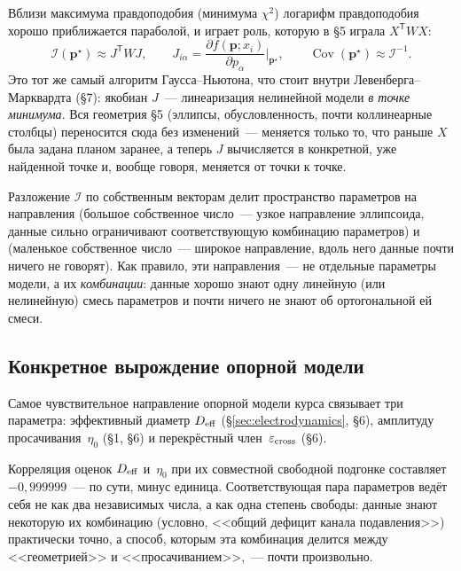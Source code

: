 \begin{strict}
Вблизи максимума правдоподобия (минимума $\chi^2$) логарифм правдоподобия хорошо приближается
параболой, и  играет роль, которую в §5 играла $X^{\mathsf T}WX$:
\begin{equation}
  \mathcal{I}(\mathbf{p}^\star)\approx J^{\mathsf T}WJ,
  \qquad
  J_{i\alpha}=\frac{\partial f(\mathbf{p};x_i)}{\partial p_\alpha}\bigg|_{\mathbf{p}^\star},
  \qquad
  \operatorname{Cov}(\mathbf{p}^\star)\approx\mathcal{I}^{-1} .
  \label{eq:fisher}
\end{equation}
Это тот же самый алгоритм Гаусса--Ньютона, что стоит внутри Левенберга--Марквардта (§7): якобиан
$J$~--- линеаризация нелинейной модели \emph{в точке минимума}. Вся геометрия §5 (эллипсы,
обусловленность, почти коллинеарные столбцы) переносится сюда без изменений~--- меняется только
то, что раньше $X$ была задана планом заранее, а теперь $J$ вычисляется в конкретной, уже
найденной точке и, вообще говоря, меняется от точки к точке.
\end{strict}

\begin{intuition}
Разложение $\mathcal{I}$ по собственным векторам делит пространство параметров на
 направления (большое собственное число~--- узкое направление
эллипсоида, данные сильно ограничивают соответствующую комбинацию параметров) и
 (маленькое собственное число~--- широкое направление, вдоль него данные
почти ничего не говорят). Как правило, эти направления~--- не отдельные параметры модели, а их
\emph{комбинации}: данные хорошо знают одну линейную (или нелинейную) смесь параметров и почти
ничего не знают об ортогональной ей смеси.
\end{intuition}

\subsection{Конкретное вырождение опорной модели}
\label{subsec:degeneracy}

Самое чувствительное направление опорной модели курса связывает три параметра: эффективный
диаметр $D_{\mathrm{eff}}$ (§\ref{sec:electrodynamics}, §6), амплитуду просачивания~$\eta_0$ (§1, §6) и
перекрёстный член~$\varepsilon_{\rm cross}$ (§6).

\begin{example}
Корреляция оценок $D_{\mathrm{eff}}$ и~$\eta_0$ при их совместной свободной подгонке составляет
$-0{,}999999$~--- по сути, минус единица. Соответствующая пара параметров ведёт себя не как два
независимых числа, а как одна степень свободы: данные знают некоторую их комбинацию (условно,
<<общий дефицит канала подавления>>) практически точно, а способ, которым эта комбинация делится
между <<геометрией>> и <<просачиванием>>,~--- почти произвольно.
\end{example}

